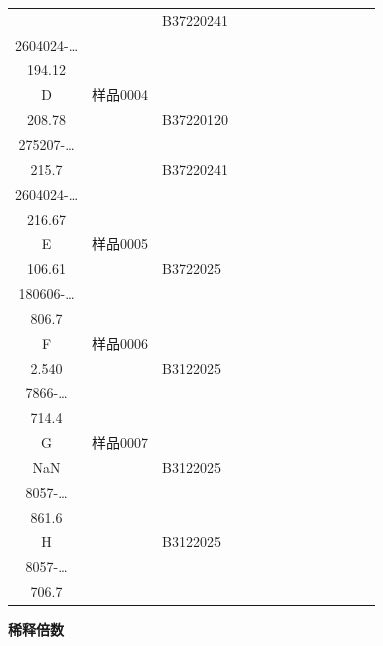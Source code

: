\documentclass[UTF8,10pt,a4paper,fontset=fandol]{ctexart}
\newcommand{\fieldvalue}[1]{#1}
\begin{document}
\begin{center}
\begin{tabular}{c|p{1.05cm}|p{1.05cm}|p{1.05cm}|p{1.05cm}|p{1.05cm}|p{1.05cm}|p{1.05cm}|p{1.05cm}|p{1.05cm}|p{1.05cm}|p{1.05cm}|p{1.05cm}}
&&
\fieldvalue{\scriptsize B37220241\\2604024-\ldots\\194.12}
&&&&&&&\\ \hline
D&
\fieldvalue{\scriptsize 样品0004\\208.78}
&&
\fieldvalue{\scriptsize B37220120\\275207-\ldots\\215.7}
&&
\fieldvalue{\scriptsize B37220241\\2604024-\ldots\\216.67}
&&&&&&&\\ \hline
E&
\fieldvalue{\scriptsize 样品0005\\106.61}
&&
\fieldvalue{\scriptsize B3722025\\180606-\ldots\\806.7}
&&&&&&&&&&&\\ \hline
F&
\fieldvalue{\scriptsize 样品0006\\2.540}
&&
\fieldvalue{\scriptsize B3122025\\7866-\ldots\\714.4}
&&&&&&&&&&&\\ \hline
G&
\fieldvalue{\scriptsize 样品0007\\NaN}
&&
\fieldvalue{\scriptsize B3122025\\8057-\ldots\\861.6}
&&&&&&&&&&&\\ \hline
H&&
\fieldvalue{\scriptsize B3122025\\8057-\ldots\\706.7}
&&&&&&&&&&&\\ \hline
\end{tabular}
\end{center}

\textbf{稀释倍数}
\end{document}

